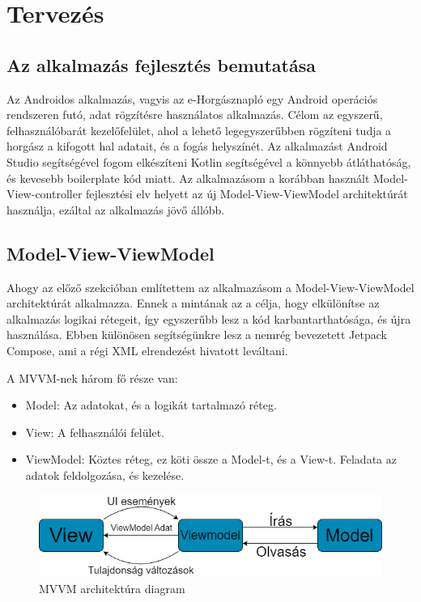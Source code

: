 \chapter{Tervezés}

\section{Az alkalmazás fejlesztés bemutatása}

Az Androidos alkalmazás, vagyis az e-Horgásznapló egy Android operációs rendszeren futó, adat rögzítésre használatos alkalmazás. Célom az egyszerű, felhasználóbarát kezelőfelület, ahol a lehető legegyszerűbben rögzíteni tudja a horgász a kifogott hal adatait, és a fogás helyszínét.
Az alkalmazást Android Studio segítségével fogom elkészíteni Kotlin segítségével a könnyebb átláthatóság, és kevesebb boilerplate\cite{boilerplate} kód miatt. Az alkalmazásom a korábban használt Model-View-controller fejlesztési elv helyett az új Model-View-ViewModel architektúrát használja, ezáltal az alkalmazás jövő állóbb.


\section{Model-View-ViewModel}

Ahogy az előző szekcióban említettem az alkalmazásom a Model-View-ViewModel architektúrát alkalmazza. Ennek a mintának az a célja, hogy elkülönítse az alkalmazás logikai rétegeit, így egyszerűbb lesz a kód karbantarthatósága, és újra használása. Ebben különösen segítségünkre lesz a nemrég bevezetett Jetpack Compose, ami a régi XML elrendezést hivatott leváltani.

A MVVM-nek\cite{mvvm} három fő része van:
\begin{itemize}
    \item Model: Az adatokat, és a logikát tartalmazó réteg.
    \item View: A felhasználói felület.
    \item ViewModel: Köztes réteg, ez köti össze a Model-t, és a View-t. Feladata az adatok feldolgozása, és kezelése.
\end{itemize}

\begin{figure}[h]
\centering
\includegraphics[scale=0.6]{images/mvvm2.png}
\caption{MVVM architektúra diagram}
\label{fig:mvvm}
\end{figure}

